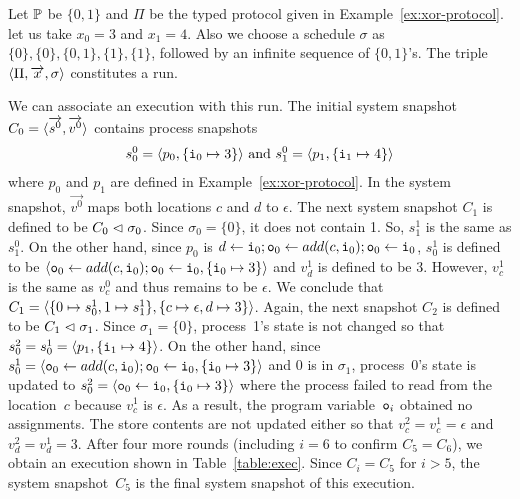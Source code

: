  \begin{example}
  Let $\mathbb{P}$ be $\{0,1\}$ and $\Pi$ be the typed protocol given in
  Example~\ref{ex:xor-protocol}.
  let us take $x_0 = 3$ and $x_1 = 4$.
  Also we choose a schedule $\sigma$ as
  $\{0\}, \{0\}, \{0,1\}, \{1\}, \{1\}$, followed by an infinite
  sequence of $\{0,1\}$'s.
  The triple $\langle{\Pi,\overrightarrow x,\sigma}\rangle$ constitutes a run.

  We can associate an execution with this run.
  The initial system snapshot $C_0=\langle{\overrightarrow{s^0},\overrightarrow{v^0}}\rangle$ contains
  process snapshots
  \begin{align*}
   s_0^0 = \langle{p_0,\{\texttt{i}_0\mapsto 3\}}\rangle\text{ and }
   s_1^0 = \langle{p_1,\{\texttt{i}_1\mapsto 4\}}\rangle
  \end{align*}
  where $p_0$ and $p_1$ are defined in Example~\ref{ex:xor-protocol}.
  In the system snapshot, $\vec{v^0}$ maps both locations $c$ and $d$ to
  $\epsilon$.
  The next system snapshot $C_1$ is defined to be $C_0\vartriangleleft\sigma_0$.
  Since $\sigma_0 = \{0\}$, it does not contain 1.
  So, $s_1^1$ is the same as $s_1^0$.
  On the other hand, since $p_0$ is $d\leftarrow \texttt{i}_0; \texttt{o}_0\leftarrow
  add(c, \texttt{i}_0); \texttt{o}_0
   \leftarrow \texttt{i}_0$, $s_0^1$ is defined to be
  $\langle{\texttt{o}_0\leftarrow
  add(c, \texttt{i}_0); \texttt{o}_0
   \leftarrow \texttt{i}_0, \{\texttt{i}_0\mapsto 3\}}\rangle$ and
  $v_d^1$ is defined to be $3$.
  However, $v_c^1$ is the same as $v_c^0$ and thus remains to be
  $\epsilon$.
  We conclude that $C_1=\langle{\{0\mapsto s_0^1,1\mapsto s_1^1\},
  \{c\mapsto \epsilon, d\mapsto 3\}}\rangle$.
  Again, the next snapshot $C_2$ is defined to be $C_1\vartriangleleft \sigma_1$.
  Since $\sigma_1 = \{0\}$, process~1's state is not changed so that
  $s_0^2 = s_0^1 = \langle{p_1,\{\texttt{i}_1\mapsto 4\}}\rangle$.
  On the other hand, since $s_0^1 = \langle{\texttt{o}_0\leftarrow
  add(c, \texttt{i}_0); \texttt{o}_0
   \leftarrow \texttt{i}_0, \{\texttt{i}_0\mapsto 3\}}\rangle$ and 0 is in $\sigma_1$,
  process~0's state is updated to
  $s_0^2 = \langle{\texttt{o}_0
   \leftarrow \texttt{i}_0, \{\texttt{i}_0\mapsto 3\}}\rangle$
  where the process failed to read from the location~$c$ because $v_c^1$
  is $\epsilon$.  As a result, the program variable~$\texttt{o}_i$ obtained
  no assignments.
  The store contents are not updated either so that $v_c^2 = v_c^1 =
  \epsilon$ and $v_d^2 = v_d^1 = 3$.
  After four more rounds (including $i = 6$ to confirm $C_5 = C_6$), we
  obtain an execution shown in Table~\ref{table:exec}.
  Since $C_i = C_5$ for $i > 5$, the system snapshot~$C_5$ is the final
  system snapshot of this execution.
 \end{example}
